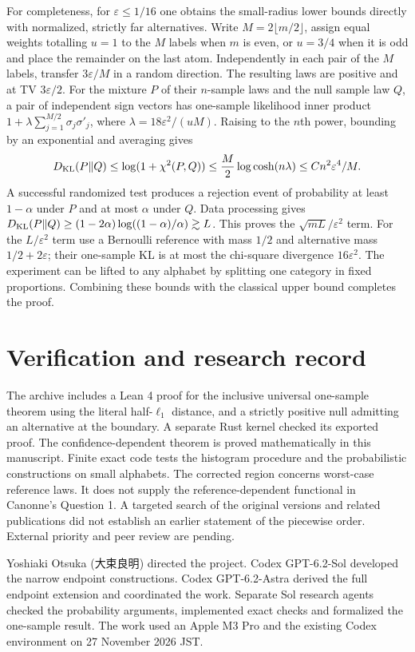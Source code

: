 \documentclass[11pt]{article}
\newcommand{\KL}{D_{\rm KL}}
\begin{document}
For completeness, for \(\varepsilon\le1/16\) one obtains the small-radius lower bounds directly with normalized, strictly far alternatives. Write \(M=2\lfloor m/2\rfloor\), assign equal weights totalling \(u=1\) to the \(M\) labels when \(m\) is even, or \(u=3/4\) when it is odd and place the remainder on the last atom. Independently in each pair of the \(M\) labels, transfer \(3\varepsilon/M\) in a random direction. The resulting laws are positive and at TV \(3\varepsilon/2\). For the mixture \(P\) of their \(n\)-sample laws and the null sample law \(Q\), a pair of independent sign vectors has one-sample likelihood inner product \(1+\lambda\sum_{j=1}^{M/2}\sigma_j\sigma'_j\), where \(\lambda=18\varepsilon^2/(uM)\). Raising to the \(n\)th power, bounding by an exponential and averaging gives
\[
\KL(P\|Q)\le\log(1+\chi^2(P,Q))
 \le \frac{M}{2}\log\cosh(n\lambda)
 \le C n^2\varepsilon^4/M.
\]
A successful randomized test produces a rejection event of probability at least \(1-\alpha\) under \(P\) and at most \(\alpha\) under \(Q\). Data processing gives \(\KL(P\|Q)\ge(1-2\alpha)\log((1-\alpha)/\alpha)\gtrsim L\). This proves the \(\sqrt{mL}/\varepsilon^2\) term. For the \(L/\varepsilon^2\) term use a Bernoulli reference with mass \(1/2\) and alternative mass \(1/2+2\varepsilon\); their one-sample KL is at most the chi-square divergence \(16\varepsilon^2\). The experiment can be lifted to any alphabet by splitting one category in fixed proportions. Combining these bounds with the classical upper bound completes the proof.

\section{Verification and research record}
The archive includes a Lean 4 proof for the inclusive universal one-sample theorem using the literal half-\(\ell_1\) distance, and a strictly positive null admitting an alternative at the boundary. A separate Rust kernel checked its exported proof. The confidence-dependent theorem is proved mathematically in this manuscript. Finite exact code tests the histogram procedure and the probabilistic constructions on small alphabets. The corrected region concerns worst-case reference laws. It does not supply the reference-dependent functional in Canonne's Question 1. A targeted search of the original versions and related publications did not establish an earlier statement of the piecewise order. External priority and peer review are pending.

Yoshiaki Otsuka ({\namefont 大束良明}) directed the project. Codex GPT-6.2-Sol developed the narrow endpoint constructions. Codex GPT-6.2-Astra derived the full endpoint extension and coordinated the work. Separate Sol research agents checked the probability arguments, implemented exact checks and formalized the one-sample result. The work used an Apple M3 Pro and the existing Codex environment on 27 November 2026 JST.
\end{document}
